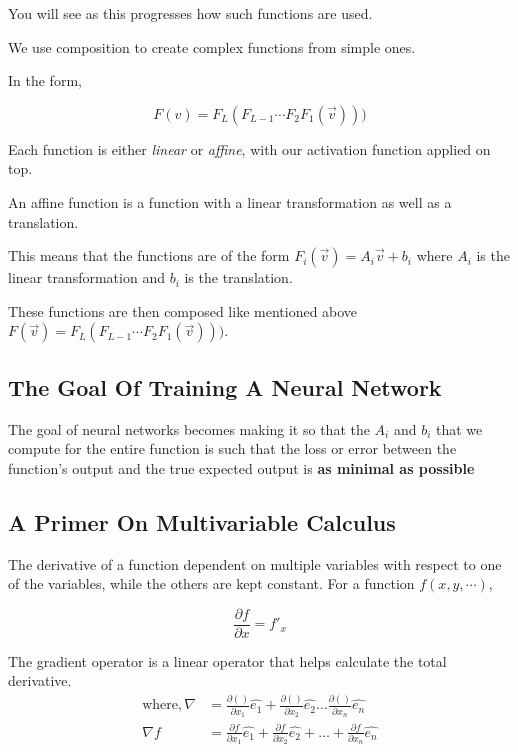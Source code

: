 \documentclass[11pt]{article}
\begin{document}
You will see as this progresses how such functions are used.

We use composition to create complex functions from simple ones.

In the form,

$$F(v) = F_L(F_{L-1} \cdots F_2F_1(\vec{v})))$$

Each function is either \emph{linear} or \emph{affine}, with our activation function applied on top.

\begin{definition}
An affine function is a function with a linear transformation as well as a translation.
\end{definition}

This means that the functions are of the form \(F_i(\vec{v}) = A_{i}\vec{v} + b_i\) where \(A_i\) is the linear transformation and \(b_i\) is the translation.

These functions are then composed like mentioned above  \(F(\vec{v}) = F_L(F_{L-1}\cdots F_2F_1(\vec{v})))\).
\subsection{The Goal Of Training A Neural Network}
\label{sec:orgc412071}
The goal of neural networks becomes making it so that the \(A_i\) and \(b_i\) that we compute for the entire function is such that the loss or error between the function's output and the true expected output is \textbf{as minimal as possible}
\subsection{A Primer On Multivariable Calculus}
\label{sec:org2595979}

\begin{definition}
The derivative of a function dependent on multiple variables with respect to one of the variables, while the others are kept constant. For a function $f(x,y,\cdots)$,

$$\frac{\partial f}{\partial x} = f'_x$$
\end{definition}

\begin{definition}
   The gradient operator is a linear operator that helps calculate the total derivative.
\begin{align*}
   \text{where}, \nabla &= \frac{\partial ()}{\partial x_1} \hat{e_1} + \frac{\partial ()}{\partial x_2} \hat{e_2} \dots \frac{\partial ()}{\partial x_n} \hat{e_n} \\
   \nabla f &= \frac{\partial f}{\partial x_1}\hat{e_1} + \frac{\partial f}{\partial x_2} \hat{e_2} + \dots + \frac{\partial f}{\partial x_n} \hat{e_n} \\
\end{align*}
\end{definition}
\end{document}
